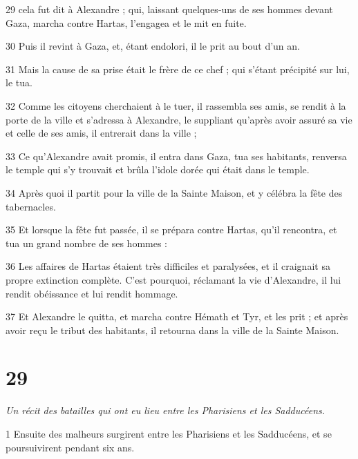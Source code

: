 \par 29 cela fut dit à Alexandre ; qui, laissant quelques-uns de ses hommes devant Gaza, marcha contre Hartas, l'engagea et le mit en fuite.

\par 30 Puis il revint à Gaza, et, étant endolori, il le prit au bout d'un an.

\par 31 Mais la cause de sa prise était le frère de ce chef ; qui s'étant précipité sur lui, le tua.

\par 32 Comme les citoyens cherchaient à le tuer, il rassembla ses amis, se rendit à la porte de la ville et s'adressa à Alexandre, le suppliant qu'après avoir assuré sa vie et celle de ses amis, il entrerait dans la ville ;

\par 33 Ce qu'Alexandre avait promis, il entra dans Gaza, tua ses habitants, renversa le temple qui s'y trouvait et brûla l'idole dorée qui était dans le temple.

\par 34 Après quoi il partit pour la ville de la Sainte Maison, et y célébra la fête des tabernacles.

\par 35 Et lorsque la fête fut passée, il se prépara contre Hartas, qu'il rencontra, et tua un grand nombre de ses hommes :

\par 36 Les affaires de Hartas étaient très difficiles et paralysées, et il craignait sa propre extinction complète. C'est pourquoi, réclamant la vie d'Alexandre, il lui rendit obéissance et lui rendit hommage.

\par 37 Et Alexandre le quitta, et marcha contre Hémath et Tyr, et les prit ; et après avoir reçu le tribut des habitants, il retourna dans la ville de la Sainte Maison.

\chapter{29}

\par \textit{Un récit des batailles qui ont eu lieu entre les Pharisiens et les Sadducéens.}

\par 1 Ensuite des malheurs surgirent entre les Pharisiens et les Sadducéens, et se poursuivirent pendant six ans.

